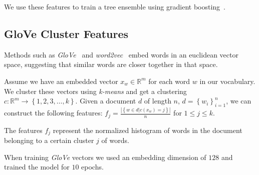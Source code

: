 We use these features to train a tree ensemble using gradient boosting~\cite{gradBoost}.

\subsection{GloVe Cluster Features}

Methods such as \textit{GloVe}~\cite{glove} and \textit{word2vec}~\cite{word2vec}
embed words in an euclidean vector space, suggesting that similar words are 
closer together in that space.

Assume we have an embedded vector $x_w \in \mathbb{R}^{m}$ for each word $w$ in our vocabulary.
We cluster these vectors using \textit{k-means} and get a clustering
$c : \mathbb{R}^{m} \rightarrow \left\{1, 2, 3, \dots, k\right\}$.
Given a document $d$ of length $n$, $d = {\left\{w_i\right\}}_{i = 1}^{n}$,
we can construct the following features: $f_j = \frac{|\left\{w \in d | c\left(x_w\right) = j\right\}|}{n}$
for $1 \le j \le k$.

The features $f_j$ represent the normalized histogram of words in the document belonging to
a certain cluster $j$ of words.

When training \textit{GloVe} vectors we used an embedding dimension of $128$ and
trained the model for $10$ epochs.

